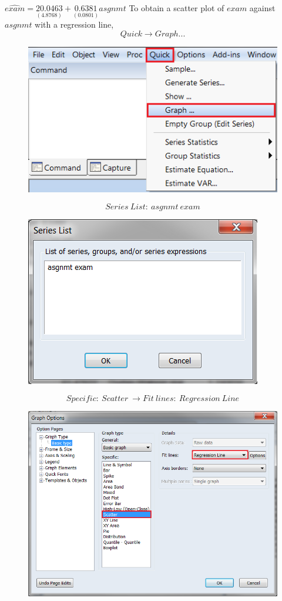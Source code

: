 \documentclass[12pt]{report}
\begin{document}
\vspace{-\baselineskip}
\centering $\widehat{exam} = \underset{(4.8768)}{20.0463} + \underset{(0.0801)}{0.6381}asgnmt$
\justify \noindent To obtain a scatter plot of $exam$ against $asgnmt$ with a regression line,
$$Quick \to Graph...$$
\begin{figure}[H]
	\centering
	\includegraphics{q1_18}
\end{figure}
\vspace{-\baselineskip}
$$Series\ List:\ asgnmt\ exam$$
\begin{figure}[H]
	\centering
	\includegraphics{q1_19}
\end{figure}
\vspace{-\baselineskip}
$$Specific:\ Scatter\ \to Fit\ lines:\ Regression\ Line$$
\begin{figure}[H]
	\centering
	\includegraphics{q1_20}
\end{figure}
\end{document}
